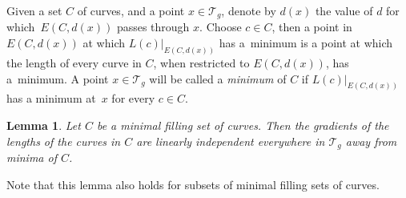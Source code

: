 \documentclass[pdftex]{sigma}
\numberwithin{equation}{section}
\newtheorem{Lemma}[Theorem]{Lemma}
\begin{document}
Given a set $C$ of curves, and a point $x\in \mathcal{T}_{g}$, denote by $d(x)$ the value of $d$ for which~$E(C,d(x))$ passes through $x$. Choose $c\in C$, then a point in $E(C,d(x))$ at which $L(c)|_{E(C,d(x))}$ has a~minimum is a point at which the length of every curve in $C$, when restricted to $E(C,d(x))$, has a~minimum. A point $x\in \mathcal{T}_{g}$ will be called a \textit{minimum} of $C$ if $L(c)|_{E(C,d(x))}$ has a minimum at~$x$ for every $c\in C$.

\begin{Lemma}
\label{polyhedronargument}
Let $C$ be a minimal filling set of curves. Then the gradients of the lengths of the curves in $C$ are linearly independent everywhere in $\mathcal{T}_{g}$ away from minima of $C$.
\end{Lemma}
\begin{Remark}
Note that this lemma also holds for subsets of minimal filling sets of curves.
\end{Remark}
\end{document}

